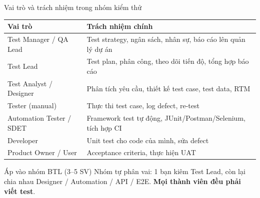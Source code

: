 \documentclass[aspectratio=169,12pt]{beamer}
\begin{document}
\begin{frame}{Vai trò và trách nhiệm trong nhóm kiểm thử}
  \begin{center}
  \scriptsize
  \setlength{\tabcolsep}{4pt}
  \begin{tabular}{>{\raggedright\arraybackslash}p{3.4cm}>{\raggedright\arraybackslash}p{8.2cm}}
    \toprule
    \textbf{Vai trò} & \textbf{Trách nhiệm chính} \\
    \midrule
    Test Manager / QA Lead & Test strategy, ngân sách, nhân sự, báo cáo lên quản lý dự án \\
    Test Lead & Test plan, phân công, theo dõi tiến độ, tổng hợp báo cáo \\
    Test Analyst / Designer & Phân tích yêu cầu, thiết kế test case, test data, RTM \\
    Tester (manual) & Thực thi test case, log defect, re-test \\
    Automation Tester / SDET & Framework test tự động, JUnit/Postman/Selenium, tích hợp CI \\
    Developer & Unit test cho code của mình, sửa defect \\
    Product Owner / User & Acceptance criteria, thực hiện UAT \\
    \bottomrule
  \end{tabular}
  \end{center}

  \vspace{0.2em}
  \begin{alertblock}{Áp vào nhóm BTL (3--5 SV)}
    \small Nhóm tự phân vai: 1 bạn kiêm Test Lead, còn lại chia nhau Designer /
    Automation / API / E2E. \textbf{Mọi thành viên đều phải viết test}.
  \end{alertblock}
\end{frame}
\end{document}
